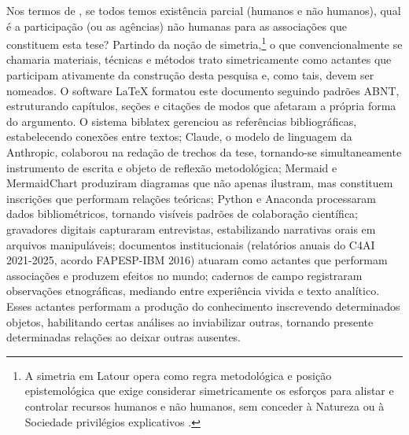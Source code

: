 Nos termos de \textcite{Latour1998Powers}, se todos temos existência parcial (humanos e não humanos), qual é a participação (ou as agências) não humanas para as associações que constituem esta tese? Partindo da noção de simetria,\footnote{A simetria em Latour opera como regra metodológica e posição epistemológica que exige considerar simetricamente os esforços para alistar e controlar recursos humanos e não humanos, sem conceder à Natureza ou à Sociedade privilégios explicativos \parencite{Latour2011CienciaEmAcao}.} o que convencionalmente se chamaria materiais, técnicas e métodos trato simetricamente como actantes que participam ativamente da construção desta pesquisa e, como tais, devem ser nomeados. O software LaTeX formatou este documento seguindo padrões ABNT, estruturando capítulos, seções e citações de modos que afetaram a própria forma do argumento. O sistema biblatex gerenciou as referências bibliográficas, estabelecendo conexões entre textos; Claude, o modelo de linguagem da Anthropic, colaborou na redação de trechos da tese, tornando-se simultaneamente instrumento de escrita e objeto de reflexão metodológica; Mermaid e MermaidChart produziram diagramas que não apenas ilustram, mas constituem inscrições que performam relações teóricas; Python e Anaconda processaram dados bibliométricos, tornando visíveis padrões de colaboração científica; gravadores digitais capturaram entrevistas, estabilizando narrativas orais em arquivos manipuláveis; documentos institucionais (relatórios anuais do C4AI 2021-2025, acordo FAPESP-IBM 2016) atuaram como actantes que performam associações e produzem efeitos no mundo; cadernos de campo registraram observações etnográficas, mediando entre experiência vivida e texto analítico. Esses actantes performam a produção do conhecimento inscrevendo determinados objetos, habilitando certas análises ao inviabilizar outras, tornando presente determinadas relações ao deixar outras ausentes.

